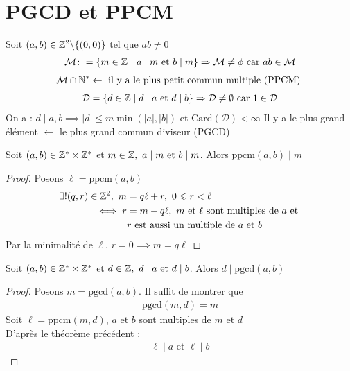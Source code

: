 \section{PGCD et PPCM}
\begin{definition}
Soit $(a, b) \in \mathbb{Z}^2 \backslash \{(0, 0)\}$ tel que $ab \neq 0$
\begin{align*}
\mathcal{M} \colon = \left\{ m \in \mathbb{Z} \ | \ a \mid m \text{ et } b \mid m \right\} \Rightarrow \mathcal{M} \neq \phi \text{ car } ab \in \mathcal{M}
\end{align*}
\begin{align*}
\mathcal{M} \cap \mathbb{N}^* \leftarrow \text{ il y a le plus petit commun multiple (PPCM) }
\end{align*}
\begin{align*}
\mathcal{D} = \left\{ d \in \mathbb{Z} \mid d \mid a \text{ et } d \mid b \right\} \Rightarrow \mathcal{D} \neq \emptyset \text{ car } 1 \in \mathcal{D}
\end{align*}
On a : $d \mid a, b \implies |d| \leq m \min (|a|, |b|)$ et $\mathrm{Card}(\mathcal{D}) < \infty$
Il y a le plus grand élément $\leftarrow$ le plus grand commun diviseur (PGCD)
\end{definition}

\begin{theoreme}[PPCM]
Soit $(a, b) \in \mathbb{Z}^* \times \mathbb{Z}^*$ et $m \in \mathbb{Z},\ a \mid m \text{ et } b \mid m$. Alors $\mathrm{ppcm}(a, b) \mid m$
\end{theoreme}

\begin{proof}
Posons $\ell = \mathrm{ppcm}(a, b)$
\begin{align*}
\exists ! (q, r) \in \mathbb{Z}^2, \ m &= q\ell + r,\ 0 \leqslant r < \ell \\
\iff r &= m - q\ell,\ m \text{ et } \ell \text{ sont multiples de } a \text{ et } 
\\
&r \text{ est aussi un multiple de } a \text{ et } b
\end{align*}
Par la minimalité de $\ell$, $r = 0 \implies m = q \ell$
\end{proof}

\begin{theoreme}[PGCD]
Soit $(a, b) \in \mathbb{Z}^* \times \mathbb{Z}^*$ et $d \in \mathbb{Z},\ d \mid a \text{ et } d \mid b$. Alors $d \mid \mathrm{pgcd}(a, b)$
\end{theoreme}

\begin{proof}
Posons $m = \mathrm{pgcd}(a, b)$. Il suffit de montrer que 
\begin{align*}
\mathrm{pgcd}(m, d) = m
\end{align*}
Soit $\ell = \mathrm{ppcm}(m ,d)$, $a$ et $b$ sont multiples de $m$ et $d$
\\
D'après le théorème précédent : 
\begin{align*}
\ell \mid a \text{ et } \ell \mid b
\end{align*}
\end{proof}

